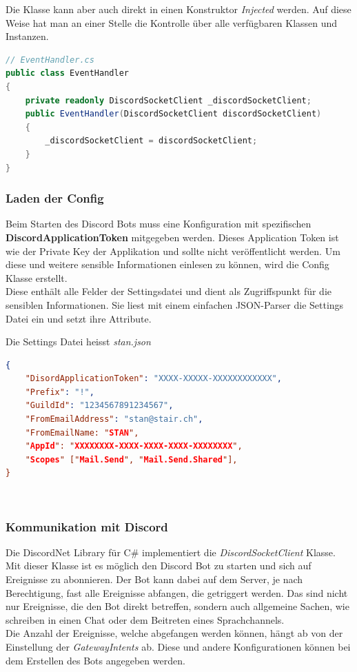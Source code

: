 \documentclass[a4paper, table]{article}
\begin{document}
Die Klasse kann aber auch direkt in einen Konstruktor \textit{Injected} werden.
Auf diese Weise hat man an einer Stelle die Kontrolle über alle verfügbaren Klassen und Instanzen.
\begin{lstlisting}[language=csharp]
// EventHandler.cs
public class EventHandler
{
    private readonly DiscordSocketClient _discordSocketClient;
    public EventHandler(DiscordSocketClient discordSocketClient)
    {
        _discordSocketClient = discordSocketClient;
    }
}
\end{lstlisting}

\subsubsection*{Laden der Config}
Beim Starten des Discord Bots muss eine Konfiguration mit spezifischen \textbf{DiscordApplicationToken} mitgegeben werden.
Dieses Application Token ist wie der Private Key der Applikation und sollte nicht veröffentlicht werden.
Um diese und weitere sensible Informationen einlesen zu können, wird die Config Klasse erstellt.\\
Diese enthält alle Felder der Settingsdatei und dient als Zugriffspunkt für die sensiblen Informationen.
Sie liest mit einem einfachen JSON-Parser die Settings Datei ein und setzt ihre Attribute.

Die Settings Datei heisst \textit{stan.json}
\begin{lstlisting}[language=json]
{
    "DisordApplicationToken": "XXXX-XXXXX-XXXXXXXXXXXX",
    "Prefix": "!",
    "GuildId": "1234567891234567",
    "FromEmailAddress": "stan@stair.ch",
    "FromEmailName: "STAN",
    "AppId": "XXXXXXXX-XXXX-XXXX-XXXX-XXXXXXXX",
    "Scopes" ["Mail.Send", "Mail.Send.Shared"],
}
\end{lstlisting}

\begin{lstlisting}
    
\end{lstlisting}

\subsubsection{Kommunikation mit Discord}
Die DiscordNet Library für C\# implementiert die \textit{DiscordSocketClient} Klasse.
Mit dieser Klasse ist es möglich den Discord Bot zu starten und sich auf Ereignisse zu abonnieren.
Der Bot kann dabei auf dem Server, je nach Berechtigung, fast alle Ereignisse abfangen, die getriggert werden.
Das sind nicht nur Ereignisse, die den Bot direkt betreffen, sondern auch allgemeine Sachen, 
wie schreiben in einen Chat oder dem Beitreten eines Sprachchannels.\\
Die Anzahl der Ereignisse, welche abgefangen werden können, hängt ab von der Einstellung der \textit{GatewayIntents} ab.
Diese und andere Konfigurationen können bei dem Erstellen des Bots angegeben werden.
\end{document}
